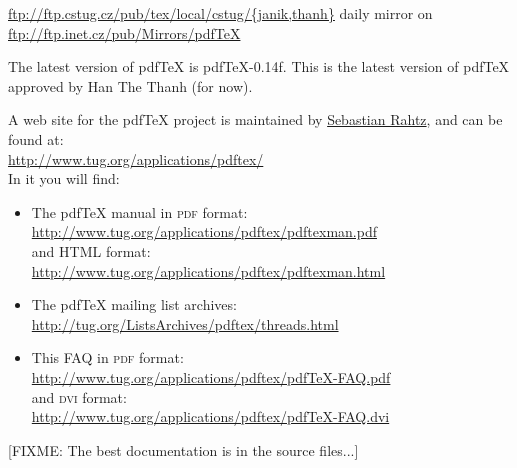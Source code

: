 \documentclass{article}
\begin{document}



\url{ftp://ftp.cstug.cz/pub/tex/local/cstug/{janik,thanh}}
  daily mirror on \url{ftp://ftp.inet.cz/pub/Mirrors/pdfTeX}



The latest version of pdf\TeX{} is pdf\TeX-0.14f. This is the latest
  version of pdf\TeX{} approved by Han The Thanh (for now). 


A web site for the pdf\TeX{} project is maintained by
   \href{mailto:sebastian.rahtz@oucs.ac.uk}{Sebastian Rahtz}, and can
  be found at:\\
  \url{http://www.tug.org/applications/pdftex/}\\
  In it you will find:
  \begin{itemize}
    \item The pdf\TeX{} manual in \textsc{pdf} format:\\
    \url{http://www.tug.org/applications/pdftex/pdftexman.pdf}\\
    and HTML format:\\
    \url{http://www.tug.org/applications/pdftex/pdftexman.html}
    \item The pdf\TeX{} mailing list archives:\\
    \url{http://tug.org/ListsArchives/pdftex/threads.html}
    \item This FAQ in \textsc{pdf} format:\\
    \url{http://www.tug.org/applications/pdftex/pdfTeX-FAQ.pdf}\\
    and \textsc{dvi} format:\\
    \url{http://www.tug.org/applications/pdftex/pdfTeX-FAQ.dvi}
  \end{itemize}

  [FIXME: The best documentation is in the source files...]

\end{document}
